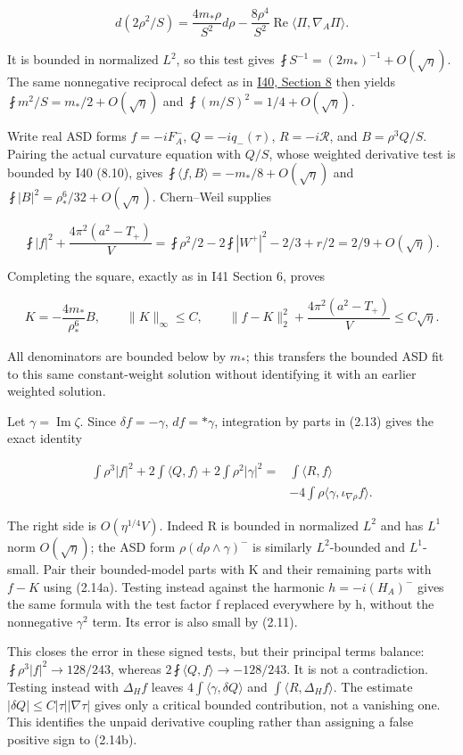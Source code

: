 \documentclass[
  11pt,
]{article}
\begin{document}
\[
d(2\rho^2/S)=\frac{4m_*\rho}{S^2}d\rho
 -\frac{8\rho^4}{S^2}\operatorname{Re}\langle\Pi,\nabla_A\Pi\rangle.
\]

It is bounded in normalized \(L^2\), so this test gives
\(\fint S^{-1}=(2m_*)^{-1}+O(\sqrt\eta)\). The same nonnegative
reciprocal defect as in
\href{20260927_mixed_current_and_signed_cores.md}{I40, Section 8} then
yields \(\fint m^2/S=m_*/2+O(\sqrt\eta)\) and
\(\fint(m/S)^2=1/4+O(\sqrt\eta)\).

Write real ASD forms \(f=-iF_A^-\), \(Q=-iq_-(\tau)\),
\(R=-i\mathcal R\), and \(B=\rho^3Q/S\). Pairing the actual curvature
equation with \(Q/S\), whose weighted derivative test is bounded by I40
(8.10), gives \(\fint\langle f,B\rangle=-m_*/8+O(\sqrt\eta)\) and
\(\fint|B|^2=\rho_*^6/32+O(\sqrt\eta)\). Chern--Weil supplies

\[
 \fint|f|^2+\frac{4\pi^2(a^2-T_+)}V
 =\fint\rho^2/2-2\fint|W^+|^2-2/3+r/2
 =2/9+O(\sqrt\eta).
\]

Completing the square, exactly as in I41 Section 6, proves

\[
 K=-\frac{4m_*}{\rho_*^6}B,\qquad \|K\|_\infty\le C,\qquad
 \|f-K\|_2^2+\frac{4\pi^2(a^2-T_+)}V\le C\sqrt\eta.
 \tag{2.14a}
\]

All denominators are bounded below by \(m_*\); this transfers the
bounded ASD fit to this same constant-weight solution without
identifying it with an earlier weighted solution.

Let \(\gamma=\operatorname{Im}\zeta\). Since \(\delta f=-\gamma\),
\(df=*\gamma\), integration by parts in (2.13) gives the exact identity

\[
\begin{aligned}
 \int\rho^3|f|^2+2\int\langle Q,f\rangle+2\int\rho^2|\gamma|^2
 ={}&\int\langle R,f\rangle\\
 &-4\int\rho\langle\gamma,\iota_{\nabla\rho}f\rangle.
\end{aligned}
 \tag{2.14b}
\]

The right side is \(O(\eta^{1/4}V)\). Indeed R is bounded in normalized
\(L^2\) and has \(L^1\) norm \(O(\sqrt\eta)\); the ASD form
\(\rho(d\rho\wedge\gamma)^-\) is similarly \(L^2\)-bounded and
\(L^1\)-small. Pair their bounded-model parts with K and their remaining
parts with \(f-K\) using (2.14a). Testing instead against the harmonic
\(h=-i(H_A)^-\) gives the same formula with the test factor f replaced
everywhere by h, without the nonnegative \(\gamma^2\) term. Its error is
also small by (2.11).

This closes the error in these signed tests, but their principal terms
balance: \(\fint\rho^3|f|^2\to128/243\), whereas
\(2\fint\langle Q,f\rangle\to-128/243\). It is not a contradiction.
Testing instead with \(\Delta_H f\) leaves
\(4\int\langle\gamma,\delta Q\rangle\) and
\(\int\langle R,\Delta_H f\rangle\). The estimate
\(|\delta Q|\le C|\tau||\nabla\tau|\) gives only a critical bounded
contribution, not a vanishing one. This identifies the unpaid derivative
coupling rather than assigning a false positive sign to (2.14b).
\end{document}
